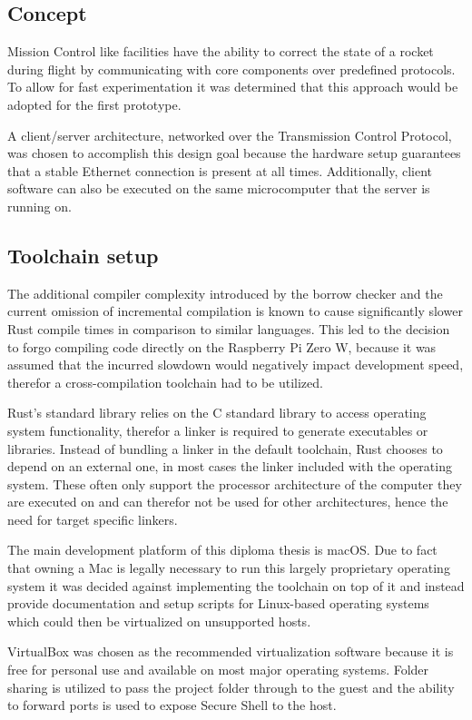 \subsection{Concept}
Mission Control like facilities have the ability to correct the state of a rocket during flight by communicating with core components over predefined protocols. To allow for fast experimentation it was determined that this approach would be adopted for the first prototype.

A client/server architecture, networked over the Transmission Control Protocol, was chosen to accomplish this design goal because the hardware setup guarantees that a stable Ethernet connection is present at all times. Additionally, client software can also be executed on the same microcomputer that the server is running on.

\subsection{Toolchain setup}
The additional compiler complexity introduced by the borrow checker and the current omission of incremental compilation is known to cause significantly slower Rust compile times in comparison to similar languages. This led to the decision to forgo compiling code directly on the Raspberry Pi Zero W, because it was assumed that the incurred slowdown would negatively impact development speed, therefor a cross-compilation toolchain had to be utilized.

Rust's standard library relies on the C standard library to access operating system functionality, therefor a linker is required to generate executables or libraries. Instead of bundling a linker in the default toolchain, Rust chooses to depend on an external one, in most cases the linker included with the operating system. These often only support the processor architecture of the computer they are executed on and can therefor not be used for other architectures, hence the need for target specific linkers.

The main development platform of this diploma thesis is macOS. Due to fact that owning a Mac is legally necessary to run this largely proprietary operating system it was decided against implementing the toolchain on top of it and instead provide documentation and setup scripts for Linux-based operating systems which could then be virtualized on unsupported hosts. 

VirtualBox was chosen as the recommended virtualization software because it is free for personal use and available on most major operating systems. Folder sharing is utilized to pass the project folder through to the guest and the ability to forward ports is used to expose Secure Shell to the host.


